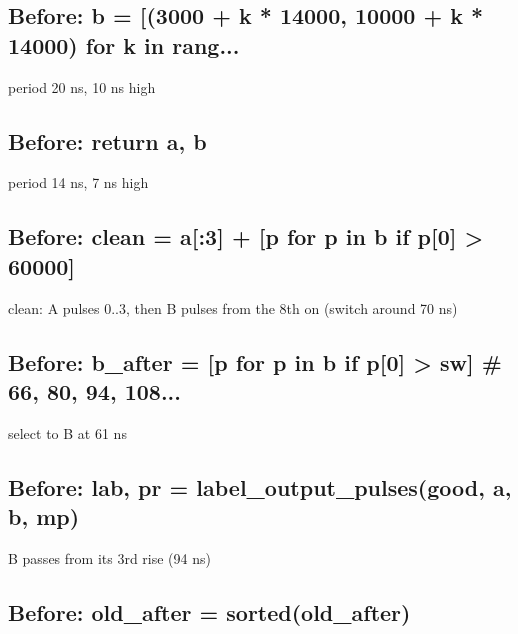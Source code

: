 \begin{record}

\subsection*{Before: b = [(3000 + k * 14000, 10000 + k * 14000) for k in rang...}

\begin{textblock}
period 20 ns, 10 ns high
\end{textblock}

\subsection*{Before: return a, b}

\begin{textblock}
period 14 ns, 7 ns high
\end{textblock}

\subsection*{Before: clean = a[:3] + [p for p in b if p[0] > 60000]}

\begin{textblock}
clean: A pulses 0..3, then B pulses from the 8th on (switch around 70 ns)
\end{textblock}

\subsection*{Before: b\_after = [p for p in b if p[0] > sw]  \# 66, 80, 94, 108...}

\begin{textblock}
select to B at 61 ns
\end{textblock}

\subsection*{Before: lab, pr = label\_output\_pulses(good, a, b, mp)}

\begin{textblock}
B passes from its 3rd rise (94 ns)
\end{textblock}

\subsection*{Before: old\_after = sorted(old\_after)}


\end{record}
